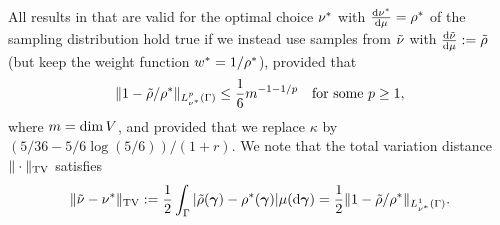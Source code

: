 \begin{pro}
	\label{pro:stability}
	All results in  that are valid for the optimal choice $\nu^{*}$ with $\frac{\mathrm{d}\nu^{*}}{\mathrm{d}\mu}=\rho^{*}$ of the sampling distribution hold true if we instead use samples from $\tilde{\nu}$ with $\frac{\mathrm{d}\tilde{\nu}}{\mathrm{d}\mu}:=\tilde{\rho}$ (but keep the weight function $w^{*}=1/\rho^{*}$), provided that
	\begin{equation*}
	\|1-\tilde{\rho}/\rho^{*}\|_{L^p_{\nu^{*}}(\Gamma)}\leq \frac{1}{6}m^{-1-1/p} \quad\text{for some }p\geq 1,
	\end{equation*}
	where $m=\dim V$,
	and provided that we replace $\kappa$ by $(5/36-5/6\log (5/6))/(1+r)$. We note that the total variation distance $\|\cdot\|_{\text{TV}}$ satisfies
	\begin{equation*}
	\|\tilde{\nu}-\nu^{*}\|_{\text{TV}}:=\frac{1}{2}\int_{\Gamma}|\tilde{\rho}(\bm{\gamma})-\rho^{*}(\bm{\gamma})|\mu(\mathrm{d}\bm{\gamma})=\frac{1}{2}\|1-\tilde{\rho}/\rho^{*}\|_{L^1_{\nu^{*}}(\Gamma)}.
	\end{equation*}
\end{pro}

